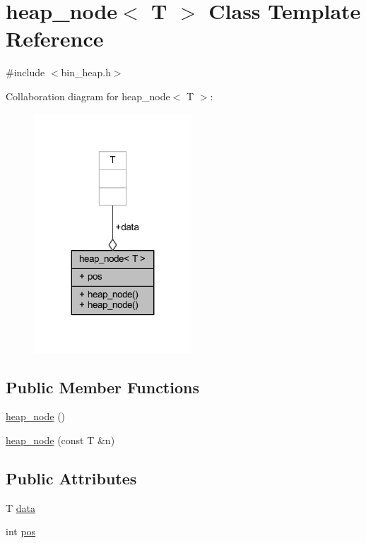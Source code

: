 \hypertarget{classheap__node}{}\section{heap\+\_\+node$<$ T $>$ Class Template Reference}
\label{classheap__node}


{\ttfamily \#include $<$bin\+\_\+heap.\+h$>$}



Collaboration diagram for heap\+\_\+node$<$ T $>$\+:\nopagebreak
\begin{figure}[H]
\begin{center}
\leavevmode
\includegraphics[width=167pt]{classheap__node__coll__graph}
\end{center}
\end{figure}
\subsection*{Public Member Functions}
\begin{DoxyCompactItemize}
\item 
\mbox{\hyperlink{classheap__node_a28a9434410001fe7fc975901ec6b7b33}{heap\+\_\+node}} ()
\item 
\mbox{\hyperlink{classheap__node_a5f7209d13a6e95fe84770ea15c6a77b1}{heap\+\_\+node}} (const T \&n)
\end{DoxyCompactItemize}
\subsection*{Public Attributes}
\begin{DoxyCompactItemize}
\item 
T \mbox{\hyperlink{classheap__node_ae37815e49df4d367e28ca4615b40e397}{data}}
\item 
int \mbox{\hyperlink{classheap__node_a6d6ebca320ede4a2dc3749caf0519534}{pos}}
\end{DoxyCompactItemize}


